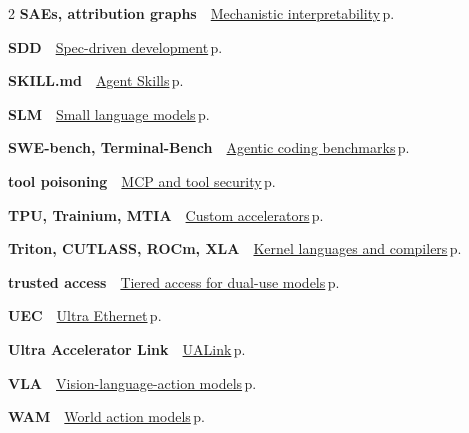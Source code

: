 \documentclass[10pt,a4paper,openany]{report}
\begin{document}
\begin{multicols}{2}
\textbf{\sffamily\color{accent}SAEs, attribution graphs}\ \ \hyperref[c:safety-6]{Mechanistic interpretability}\,{\color{muted}\scriptsize p.\,\pageref{c:safety-6}}\par\vspace{2pt}
\textbf{\sffamily\color{accent}SDD}\ \ \hyperref[c:coding-3]{Spec-driven development}\,{\color{muted}\scriptsize p.\,\pageref{c:coding-3}}\par\vspace{2pt}
\textbf{\sffamily\color{accent}SKILL.md}\ \ \hyperref[c:protocols-5]{Agent Skills}\,{\color{muted}\scriptsize p.\,\pageref{c:protocols-5}}\par\vspace{2pt}
\textbf{\sffamily\color{accent}SLM}\ \ \hyperref[c:arch-11]{Small language models}\,{\color{muted}\scriptsize p.\,\pageref{c:arch-11}}\par\vspace{2pt}
\textbf{\sffamily\color{accent}SWE-bench, Terminal-Bench}\ \ \hyperref[c:evals-3]{Agentic coding benchmarks}\,{\color{muted}\scriptsize p.\,\pageref{c:evals-3}}\par\vspace{2pt}
\textbf{\sffamily\color{accent}tool poisoning}\ \ \hyperref[c:safety-4]{MCP and tool security}\,{\color{muted}\scriptsize p.\,\pageref{c:safety-4}}\par\vspace{2pt}
\textbf{\sffamily\color{accent}TPU, Trainium, MTIA}\ \ \hyperref[c:hardware-11]{Custom accelerators}\,{\color{muted}\scriptsize p.\,\pageref{c:hardware-11}}\par\vspace{2pt}
\textbf{\sffamily\color{accent}Triton, CUTLASS, ROCm, XLA}\ \ \hyperref[c:hardware-13]{Kernel languages and compilers}\,{\color{muted}\scriptsize p.\,\pageref{c:hardware-13}}\par\vspace{2pt}
\textbf{\sffamily\color{accent}trusted access}\ \ \hyperref[c:landscape-2]{Tiered access for dual-use models}\,{\color{muted}\scriptsize p.\,\pageref{c:landscape-2}}\par\vspace{2pt}
\textbf{\sffamily\color{accent}UEC}\ \ \hyperref[c:hardware-5]{Ultra Ethernet}\,{\color{muted}\scriptsize p.\,\pageref{c:hardware-5}}\par\vspace{2pt}
\textbf{\sffamily\color{accent}Ultra Accelerator Link}\ \ \hyperref[c:hardware-3]{UALink}\,{\color{muted}\scriptsize p.\,\pageref{c:hardware-3}}\par\vspace{2pt}
\textbf{\sffamily\color{accent}VLA}\ \ \hyperref[c:embodied-0]{Vision-language-action models}\,{\color{muted}\scriptsize p.\,\pageref{c:embodied-0}}\par\vspace{2pt}
\textbf{\sffamily\color{accent}WAM}\ \ \hyperref[c:embodied-1]{World action models}\,{\color{muted}\scriptsize p.\,\pageref{c:embodied-1}}\par\vspace{2pt}
\end{multicols}
\end{document}
